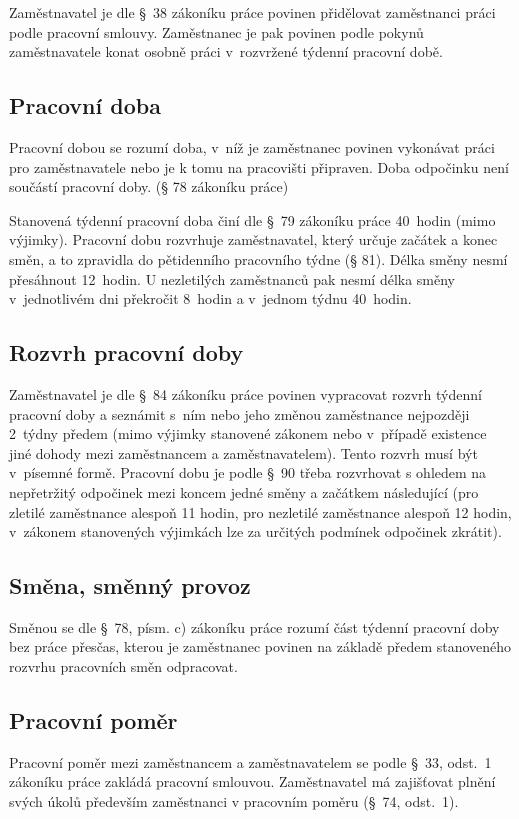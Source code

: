 \documentclass[twoside]{ctuthesis}
\begin{document}
Zaměstnavatel je dle §~38 zákoníku práce povinen přidělovat zaměstnanci práci podle pracovní smlouvy. Zaměstnanec je pak povinen podle pokynů zaměstnavatele konat osobně práci v~rozvržené týdenní pracovní době.

\subsection{Pracovní doba}
Pracovní dobou se rozumí doba, v~níž je zaměstnanec povinen vykonávat práci pro zaměstnavatele nebo je k tomu na pracovišti připraven. Doba odpočinku není součástí pracovní doby. (§ 78 zákoníku práce)

Stanovená týdenní pracovní doba činí dle §~79 zákoníku práce 40~hodin (mimo výjimky). Pracovní dobu rozvrhuje zaměstnavatel, který určuje začátek a konec směn, a to zpravidla do pětidenního pracovního týdne (§ 81). Délka směny nesmí přesáhnout 12~hodin. U nezletilých zaměstnanců pak nesmí délka směny v~jednotlivém dni překročit 8~hodin a v~jednom týdnu 40~hodin.

\subsection{Rozvrh pracovní doby}
Zaměstnavatel je dle §~84 zákoníku práce povinen vypracovat rozvrh týdenní pracovní doby a seznámit s~ním nebo jeho změnou zaměstnance nejpozději 2~týdny předem (mimo výjimky stanovené zákonem nebo v~případě existence jiné dohody mezi zaměstnancem a zaměstnavatelem). Tento rozvrh musí být v~písemné formě. Pracovní dobu je podle §~90 třeba rozvrhovat s ohledem na nepřetržitý odpočinek mezi koncem jedné směny a začátkem následující (pro zletilé zaměstnance alespoň 11 hodin, pro nezletilé zaměstnance alespoň 12 hodin, v~zákonem stanovených výjimkách lze za určitých podmínek odpočinek zkrátit).

\subsection{Směna, směnný provoz}
Směnou se dle §~78, písm. c) zákoníku práce rozumí část týdenní pracovní doby bez práce přesčas, kterou je zaměstnanec povinen na základě předem stanoveného rozvrhu pracovních směn odpracovat.

\subsection{Pracovní poměr}
Pracovní poměr mezi zaměstnancem a zaměstnavatelem se podle §~33, odst.~1 zákoníku práce zakládá pracovní smlouvou. Zaměstnavatel má zajišťovat plnění svých úkolů především zaměstnanci v pracovním poměru (§~74, odst.~1).
\end{document}
